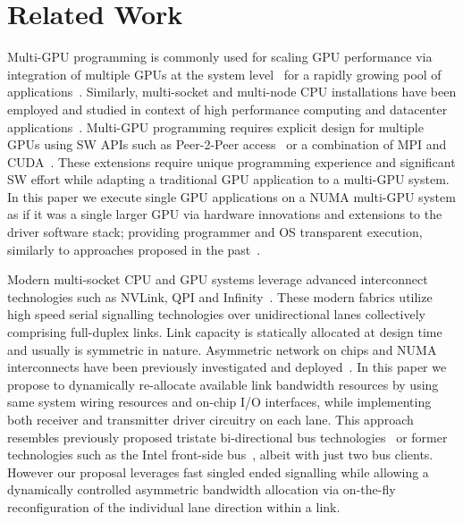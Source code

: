 \vspace{-0.1in}
\section{Related Work}
Multi-GPU programming is commonly used for scaling GPU performance via integration 
of multiple GPUs at the system 
level~\cite{pascal-tesla-wp,dgx,intersect360,titan_supercomputer} for a 
rapidly growing pool of 
applications~\cite{coral,cudnn,Lavin15b,SimonyanZ14a}. Similarly, 
multi-socket and multi-node CPU installations have been employed and studied 
in context of high performance computing and datacenter 
applications~\cite{Intel:Xeon,IBM:Power,IBM:z196,AMD:Opteron}.
Multi-GPU programming requires explicit design for multiple GPUs
using SW APIs such as Peer-2-Peer access~\cite{NVIDIAP2P} or a combination of
MPI and CUDA~\cite{NVIDIAMPI}. These extensions require
unique programming experience and significant SW effort while adapting a
traditional GPU application to a multi-GPU system. In this paper
we execute single GPU applications on a NUMA multi-GPU system as if it was a single
larger GPU via hardware innovations and extensions to the driver software stack;
providing programmer and OS transparent execution, similarly to approaches
proposed in the past~\cite{Cabezas2015,lee2013transparent,ben2015memory}.

Modern multi-socket CPU and GPU systems leverage advanced interconnect
technologies such as NVLink, QPI and
Infinity~\cite{dgx,INTELQPI,AMDINFINITYFABRIC}. These modern fabrics utilize
high speed serial signalling technologies over unidirectional lanes
collectively comprising full-duplex links. Link capacity is
statically allocated at design time and usually is symmetric in nature. Asymmetric
network on chips and NUMA interconnects have been previously investigated
and deployed~\cite{ziabari2015asymmetric, phillips2014m7}. In this
paper we propose to dynamically re-allocate available link bandwidth resources
by using same system wiring resources and on-chip I/O interfaces, while
implementing both receiver and transmitter driver circuitry on each lane. This
approach resembles previously proposed tristate bi-directional bus
technologies~\cite{tri-state} or former technologies such as the Intel front-side
bus~\cite{fsb}, albeit with just two bus clients. However our proposal leverages fast
singled ended signalling while allowing a dynamically controlled
asymmetric bandwidth allocation via on-the-fly reconfiguration of the
individual lane direction within a link.

